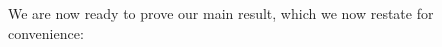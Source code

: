 \documentclass{patmorin}
\begin{document}




We are now ready to prove our main result, which we now restate for convenience:

\mmg*
\end{document}
